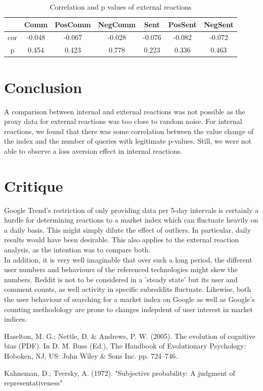 \documentclass[12pt]{article}
\begin{document}
\begin{table}[h!]
\centering
\begin{tabular}{|| c ||c c c c c c||} 
 \hline
 & Comm & PosComm & NegComm & Sent & PosSent & NegSent \\ [0.5ex] 
 \hline\hline
 cor & -0.048 & -0.067 & -0.028 & -0.076 & -0.082 & -0.072\\ 
 p & 0.454 & 0.423 & 0.778 & 0.223 & 0.336 & 0.463\\
 \hline
\end{tabular}
\caption{Correlation and p values of external reactions}
\label{table:externalReactions}
\end{table}

\section{Conclusion}

A comparison between internal and external reactions was not possible as the proxy data for external reactions was too close to random noise. For internal reactions, we found that there was some correlation between the value change of the index and the number of queries with legitimate p-values. Still, we were not able to observe a loss aversion effect in internal reactions.

\section{Critique}
Google Trend's restriction of only providing data per 5-day intervals is certainly a hurdle for determining reactions to a market index which can fluctuate heavily on a daily basis. This might simply dilute the effect of outliers. In particular, daily results would have been desirable. This also applies to the external reaction analysis, as the intention was to compare both. \\
In addition, it is very well imaginable that over such a long period, the different user numbers and behaviours of the referenced technologies might skew the numbers. Reddit is not to be considered in a 'steady state' but its user and comment counts, as well activity in specific subreddits fluctuate. Likewise, both the user behaviour of searching for a market index on Google as well as Google's counting methodology are prone to changes indepdent of user interest in market indices. 
\newpage
\begin{thebibliography}{9}

Haselton, M. G.; Nettle, D. \& Andrews, P. W. (2005). The evolution of cognitive bias (PDF). In D. M. Buss (Ed.), The Handbook of Evolutionary Psychology: Hoboken, NJ, US: John Wiley \& Sons Inc. pp. 724–746.
 
 Kahneman, D.; Tversky, A. (1972). "Subjective probability: A judgment of representativeness"
\end{thebibliography}
\end{document}
